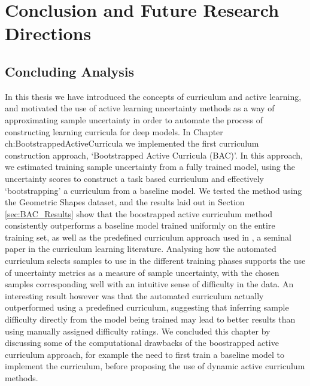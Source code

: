 \chapter{Conclusion and Future Research Directions}
\section{Concluding Analysis}
In this thesis we have introduced the concepts of curriculum and active learning, and motivated the use of active learning uncertainty methods as a way of approximating sample uncertainty in order to automate the process of constructing learning curricula for deep models. In Chapter {ch:BootstrappedActiveCurricula} we implemented the first  curriculum construction approach, `Bootstrapped Active Curricula (BAC)'. In this approach, we estimated training sample uncertainty from a fully trained model, using the uncertainty scores to construct a task based curriculum and effectively `bootstrapping' a curriculum from a baseline model. We tested the method using the Geometric Shapes dataset, and the results laid out in Section \ref{sec:BAC_Results} show that the boostrapped active curriculum method consistently outperforms a baseline model trained uniformly on the entire training set, as well as the predefined curriculum approach used in \cite{Bengio2009}, a seminal paper in the curriculum learning literature. Analysing how the automated curriculum selects samples to use in the different training phases supports the use of uncertainty metrics as a measure of sample uncertainty, with the chosen samples corresponding well with an intuitive sense of difficulty in the data. An interesting result however was that the automated curriculum actually outperformed using a predefined curriculum, suggesting that inferring sample difficulty directly from the model being trained may lead to better results than using manually assigned difficulty ratings. We concluded this chapter by discussing some of the computational drawbacks of the boostrapped active curriculum approach, for example the need to first train a baseline model to implement the curriculum, before proposing the use of dynamic active curriculum methods.

